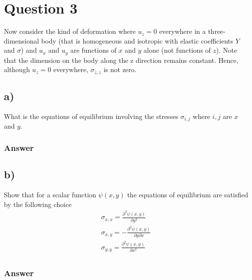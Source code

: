 \documentclass{article}
\begin{document}
\begin{comment}
    \implies \frac{Y}{2(1-2\sigma)}\left(\frac{\partial^2 u_\alpha}{\partial x_\beta^2} + \frac{\partial^2 u_\beta}{\partial x_\alpha\partial x_\beta}\right) &= \rho\frac{\partial^2 u_\alpha}{\partial t^2}\\
    \implies \frac{Y}{2(1-2\sigma)}\left(\frac{\partial^2 u_\alpha}{\partial x_\beta^2} + \frac{\partial^2 u_\beta}{\partial x_\alpha\partial x_\beta}\right) &= \rho\frac{\partial^2 u_\alpha}{\partial t^2}\\
\end{align*}This is the equation of deformation of a small volume in a homogeneous and isotropic material in three dimensions.
\end{comment}
\section*{Question 3}
Now consider the kind of deformation where $u_z = 0$ everywhere in a three-dimensional body (that is homogeneous and isotropic with elastic coefficients $Y$ and $\sigma$) and $u_x$ and $u_y$ are functions of $x$ and $y$ alone (not functions of $z$). Note that the dimension on the body along the z direction remains constant. Hence, although $u_z = 0$ everywhere, $\sigma_{z,z}$ is not zero.
\subsection*{a)}
What is the equations of equilibrium involving the stresses $\sigma_{i,j}$ where $i,j$ are $x$ and $y$.

\subsubsection*{Answer}

\subsection*{b)}
Show that for a scalar function $\psi(x,y)$ the equations of equilibrium are satisfied by the following choice
\begin{align}
    \sigma_{x,x} = \frac{\partial^2\psi(x,y)}{\partial y^2}\\
    \sigma_{x,y} = -\frac{\partial^2\psi(x,y)}{\partial y\partial x}\\
    \sigma_{y,y} = \frac{\partial^2\psi(x,y)}{\partial x^2}\\
\end{align}

\subsubsection*{Answer}
\end{document}
